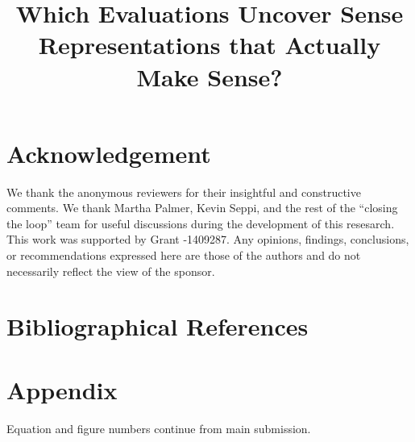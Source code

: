 \documentclass[table, 10pt, a4paper]{article} \usepackage{style/lrec}  \usepackage{tocloft}
\title{Which Evaluations Uncover Sense Representations that Actually Make Sense?}
\renewcommand\thesection{\arabic{section}}
\newcommand{\latexfile}[1]{}
\newcommand{\appendixmention}[1]{#1}
\begin{document}
\maketitleabstract

	\latexfile{10-introduction}
	\latexfile{20-model}
	\latexfile{training}
	\latexfile{30-interpretability}
	\latexfile{40-eval}        
	\latexfile{50-discussion}
	\latexfile{60-related}
	\latexfile{70-conclusion}


        \section*{Acknowledgement}

        We thank the anonymous reviewers for their insightful and
        constructive comments. We thank Martha Palmer, Kevin Seppi,
        and the rest of the ``closing the loop'' team for useful
        discussions during the development of this resesarch.  This
        work was supported by  Grant -1409287.  Any
        opinions, findings, conclusions, or recommendations expressed
        here are those of the authors and do not necessarily reflect
        the view of the sponsor.


    
\newpage
        
\section{Bibliographical References}\label{reference}




\appendixmention{
\clearpage

\section*{Appendix}

Equation and
figure numbers continue from main submission.

\setcounter{section}{0}
\renewcommand{\thesection}{\Alph{section}} 
\latexfile{appendix}
}
\end{document}
